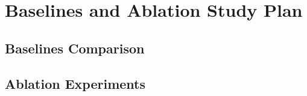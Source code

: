 \section{Baselines and Ablation Study Plan}
\subsection{Baselines Comparison}
\subsection{Ablation Experiments}

